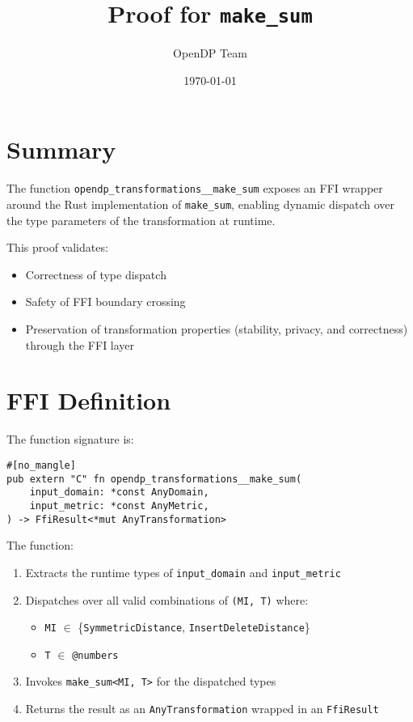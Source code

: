 \documentclass{article}
\title{Proof for \texttt{make\_sum}}
\author{OpenDP Team}
\date{\today}
\begin{document}
\maketitle

\section{Summary}

The function \texttt{opendp\_transformations\_\_make\_sum} exposes an FFI wrapper around the Rust implementation of \texttt{make\_sum}, enabling dynamic dispatch over the type parameters of the transformation at runtime.

This proof validates:
\begin{itemize}
  \item Correctness of type dispatch
  \item Safety of FFI boundary crossing
  \item Preservation of transformation properties (stability, privacy, and correctness) through the FFI layer
\end{itemize}

\section{FFI Definition}

The function signature is:

\begin{verbatim}
#[no_mangle]
pub extern "C" fn opendp_transformations__make_sum(
    input_domain: *const AnyDomain,
    input_metric: *const AnyMetric,
) -> FfiResult<*mut AnyTransformation>
\end{verbatim}

The function:
\begin{enumerate}
  \item Extracts the runtime types of \texttt{input\_domain} and \texttt{input\_metric}
  \item Dispatches over all valid combinations of \texttt{(MI, T)} where:
    \begin{itemize}
      \item \texttt{MI} $\in$ \{\texttt{SymmetricDistance}, \texttt{InsertDeleteDistance}\}
      \item \texttt{T} $\in$ \texttt{@numbers}
    \end{itemize}
  \item Invokes \texttt{make\_sum<MI, T>} for the dispatched types
  \item Returns the result as an \texttt{AnyTransformation} wrapped in an \texttt{FfiResult}
\end{enumerate}
\end{document}
